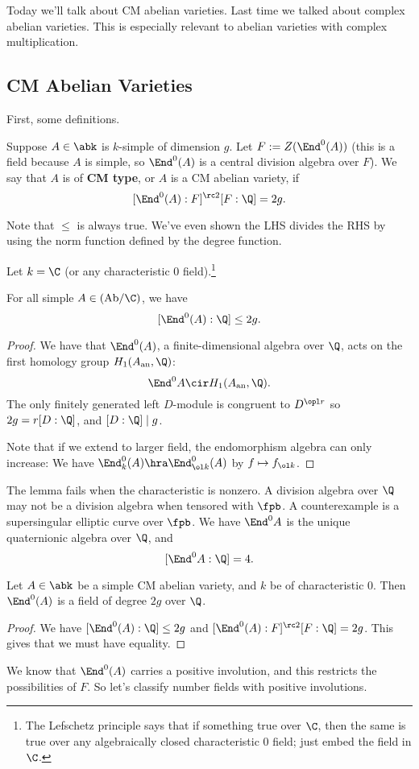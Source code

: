 
Today we'll talk about CM abelian varieties. Last time we talked about complex abelian varieties. This is especially relevant to abelian varieties with complex multiplication.

\subsection{CM Abelian Varieties}

First, some definitions.
\begin{df}
Suppose $A\in \abk$ is $k$-simple of dimension $g$. Let $F:=Z(\End^0(A))$ (this is a field because $A$ is simple, so $\End^0(A)$ is a central division algebra over $F$). We say that $A$ is of \textbf{CM type}, or $A$ is a CM abelian variety, if 
\[
[\End^0(A):F]^{\rc 2}[F:\Q]=2g.
\]
\end{df}
Note that $\le$ is always true. We've even shown the LHS divides the RHS by using the norm function defined by the degree function.
\begin{lem}
Let $k=\C$ (or any characteristic 0 field).\footnote{The Lefschetz principle says that if something true over $\C$, then the same is true over any algebraically closed characteristic 0 field; just embed the field in $\C$.}

For all simple $A\in (\text{Ab}/\C)$, we have
\[
[\End^0(A):\Q]\le 2g.
\]
\end{lem}
\begin{proof}
We have that $\End^0(A)$, a finite-dimensional algebra over $\Q$, acts on the first homology group $H_1(A_{\text{an}}, \Q)$:
\[
\End^0A\cir H_1(A_{\text{an}}, \Q).
\]
The only finitely generated left $D$-module is congruent to $D^{\opl r}$ so $2g=r[D:\Q]$, and $[D:\Q]\mid g$.


Note that if we extend to larger field, the endomorphism algebra can only increase: We have $\End_k^0(A)\hra \End_{\ol k}^0(A)$ by $f\mapsto f_{\ol k}$.
\end{proof}
\begin{rem}
The lemma fails when the characteristic is nonzero.  
A division algebra over $\Q$ may not be a division algebra when tensored with $\fpb$. A counterexample is a supersingular elliptic curve over $\fpb$. We have $\End^0A$ is the unique quaternionic algebra over $\Q$, and 
\[
[\End^0A:\Q]=4.
\]
\end{rem}
\begin{cor}
Let $A\in \abk$ be a simple CM abelian variety, and $k$ be of characteristic 0. Then $\End^0(A)$ is a field of degree $2g$ over $\Q$.
\end{cor}
\begin{proof}
We have $[\End^0(A):\Q]\le 2g$ and $[\End^0(A):F]^{\rc 2}[F:\Q]=2g$. This gives that we must have equality. %
\end{proof}
We know that $\End^0(A)$ carries a positive involution, and this restricts the possibilities of $F$.
So let's classify number fields with positive involutions.
